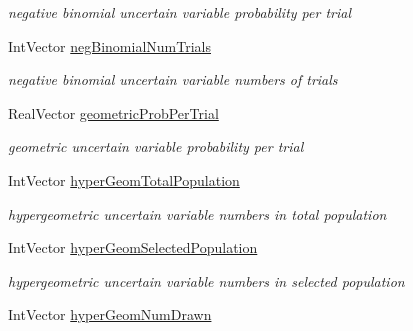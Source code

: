 \begin{DoxyCompactItemize}
\begin{DoxyCompactList}\small\item\em negative binomial uncertain variable probability per trial \end{DoxyCompactList}\item 
Int\+Vector \hyperlink{classPecos_1_1AleatoryDistParamsRep_ae49420f7a5296458dfe4c7b0f963d079}{neg\+Binomial\+Num\+Trials}\label{classPecos_1_1AleatoryDistParamsRep_ae49420f7a5296458dfe4c7b0f963d079}

\begin{DoxyCompactList}\small\item\em negative binomial uncertain variable numbers of trials \end{DoxyCompactList}\item 
Real\+Vector \hyperlink{classPecos_1_1AleatoryDistParamsRep_ae59f1cb38d308c99f050c570ea8846c8}{geometric\+Prob\+Per\+Trial}\label{classPecos_1_1AleatoryDistParamsRep_ae59f1cb38d308c99f050c570ea8846c8}

\begin{DoxyCompactList}\small\item\em geometric uncertain variable probability per trial \end{DoxyCompactList}\item 
Int\+Vector \hyperlink{classPecos_1_1AleatoryDistParamsRep_aaaed7faa5feaface1bf56d9586598946}{hyper\+Geom\+Total\+Population}\label{classPecos_1_1AleatoryDistParamsRep_aaaed7faa5feaface1bf56d9586598946}

\begin{DoxyCompactList}\small\item\em hypergeometric uncertain variable numbers in total population \end{DoxyCompactList}\item 
Int\+Vector \hyperlink{classPecos_1_1AleatoryDistParamsRep_a3d23d1549c67697491eceaa0ddd2d1f1}{hyper\+Geom\+Selected\+Population}\label{classPecos_1_1AleatoryDistParamsRep_a3d23d1549c67697491eceaa0ddd2d1f1}

\begin{DoxyCompactList}\small\item\em hypergeometric uncertain variable numbers in selected population \end{DoxyCompactList}\item 
Int\+Vector \hyperlink{classPecos_1_1AleatoryDistParamsRep_a7d3b15ece705c89783c8b0eb55f429cf}{hyper\+Geom\+Num\+Drawn}\label{classPecos_1_1AleatoryDistParamsRep_a7d3b15ece705c89783c8b0eb55f429cf}


\end{DoxyCompactItemize}

